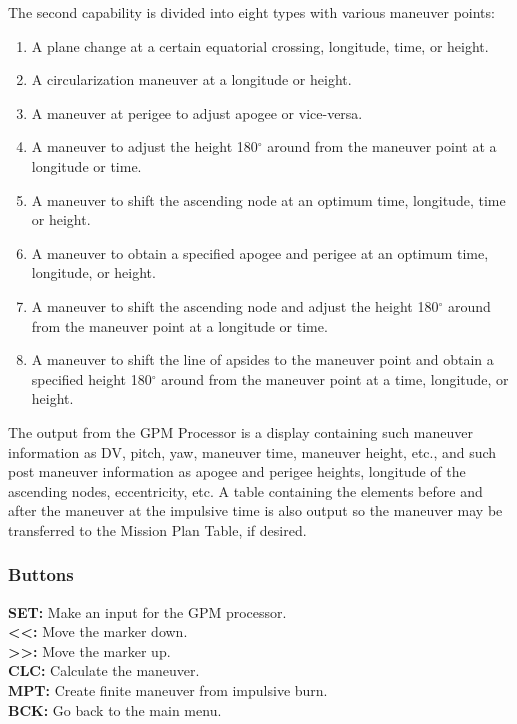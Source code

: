 \documentclass[11pt]{article} %
\begin{document}
The second capability is divided into eight types with various maneuver points:

\begin{enumerate}
	\item A plane change at a certain equatorial crossing, longitude, time, or height.
	\item A circularization maneuver at a longitude or height.
	\item A maneuver at perigee to adjust apogee or vice-versa.
	\item A maneuver to adjust the height 180$^{\circ}$ around from the maneuver point at a longitude or time.
	\item A maneuver to shift the ascending node at an optimum time, longitude, time or height.
	\item A maneuver to obtain a specified apogee and perigee at an optimum time, longitude, or height.
	\item A maneuver to shift the ascending node and adjust the height 180$^{\circ}$ around from the maneuver point at a longitude or time.
\item A maneuver to shift the line of apsides to the maneuver point and obtain a specified height 180$^{\circ}$ around from the maneuver point at a time, longitude, or height.
\end{enumerate}

The output from the GPM Processor is a display containing such maneuver information as DV, pitch, yaw, maneuver time, maneuver height, etc., and such post maneuver information as apogee and perigee heights, longitude of the ascending nodes, eccentricity, etc. A table containing the elements before and after the maneuver at the impulsive time is also output so the maneuver may be transferred to the Mission Plan Table, if desired.\\

\subsubsection{Buttons}

\textbf{SET:} Make an input for the GPM processor.\\
\textbf{<<:} Move the marker down.\\  
\textbf{>>:} Move the marker up.\\
\textbf{CLC:} Calculate the maneuver.\\
\textbf{MPT:} Create finite maneuver from impulsive burn.\\
\textbf{BCK:} Go back to the main menu.\\
\newpage
\end{document}
